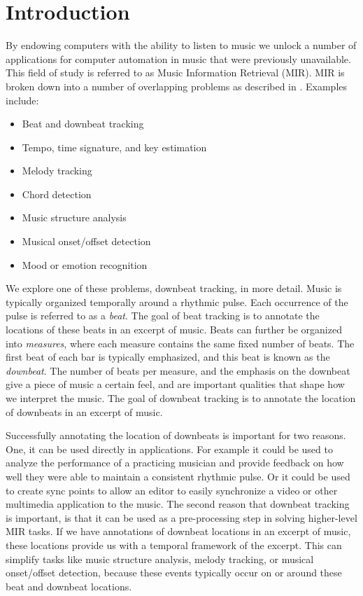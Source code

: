 \documentclass[conference]{IEEEtran}
\begin{document}
\section{Introduction}
By endowing computers with the ability to listen to music we unlock a number of
applications for computer automation in music that were previously unavailable.
This field of study is referred to as Music Information Retrieval (MIR). MIR is
broken down into a number of overlapping problems as described in \cite{b1}.
Examples include:
\begin{itemize}
\item Beat and downbeat tracking
\item Tempo, time signature, and key estimation
\item Melody tracking
\item Chord detection
\item Music structure analysis
\item Musical onset/offset detection
\item Mood or emotion recognition
\end{itemize}

We explore one of these problems, downbeat tracking, in more detail. Music is
typically organized temporally around a rhythmic pulse. Each occurrence of the
pulse is referred to as a \textit{beat}. The goal of beat tracking is to annotate
the locations of these beats in an excerpt of music. Beats can further be
organized into \textit{measures}, where each measure contains the same fixed
number of beats. The first beat of each bar is typically emphasized, and this
beat is known as the \textit{downbeat}. The number of beats per measure, and
the emphasis on the downbeat give a piece of music a certain feel, and are
important qualities that shape how we interpret the music. The goal of downbeat
tracking is to annotate the location of downbeats in an excerpt of music.

Successfully annotating the location of downbeats is important for two reasons.
One, it can be used directly in applications. For example it could be used to
analyze the performance of a practicing musician and provide feedback on how
well they were able to maintain a consistent rhythmic pulse. Or it could be
used to create sync points to allow an editor to easily synchronize a
video or other multimedia application to the music. The second reason that
downbeat tracking is important, is that it can be used as a pre-processing step
in solving higher-level MIR tasks. If we have annotations of downbeat locations
in an excerpt of music, these locations provide us with a temporal framework
of the excerpt. This can simplify tasks like music structure analysis, melody
tracking, or musical onset/offset detection, because these events typically
occur on or around these beat and downbeat locations.
\end{document}
